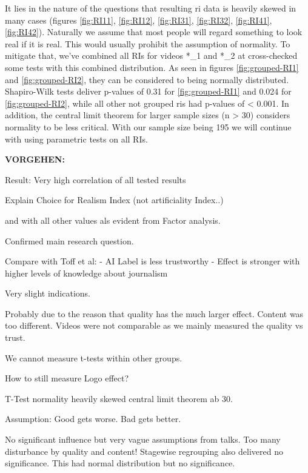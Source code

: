 \documentclass[
  a4paper,  %
  twoside,  %
  bibliography=totoc,
  headsepline,
  cleardoublepage=empty,
  parskip=half,
  draft=false
]{scrbook}
\begin{document}
It lies in the nature of the questions that resulting \gls{ri} data is heavily skewed in many cases (figures \ref{fig:RI11}, \ref{fig:RI12}, \ref{fig:RI31}, \ref{fig:RI32}, \ref{fig:RI41}, \ref{fig:RI42}). Naturally we assume that most people will regard something to look real if it is real. This would usually prohibit the assumption of normality. To mitigate that, we've combined all RIs for videos *\_1 and *\_2 at cross-checked some tests with this combined distribution. As seen in figures \ref{fig:grouped-RI1} and \ref{fig:grouped-RI2}, they can be considered to being normally distributed. Shapiro-Wilk tests deliver p-values of 0.31 for \ref{fig:grouped-RI1} and 0.024 for \ref{fig:grouped-RI2}, while all other not grouped \gls{ri}s had p-values of < 0.001. In addition, the central limit theorem for larger sample sizes (n > 30) considers normality to be less critical. With our sample size being 195 we will continue with using parametric tests on all RIs.



\textbf{VORGEHEN:}

Result: Very high correlation of all tested results

Explain Choice for Realism Index (not artificiality Index..)

and with all other values als evident from Factor analysis.

Confirmed main research question.


Compare with Toff et al: 
- AI Label is less trustworthy
- Effect is stronger with higher levels of knowledge about journalism

Very slight indications. 

Probably due to the reason that quality has the much larger effect.
Content was too different. Videos were not comparable as we mainly measured the quality vs trust. 

We cannot measure t-tests within other groups. 

How to still measure Logo effect? 


T-Test normality heavily skewed
central limit theorem ab 30.

Assumption: Good gets worse. Bad gets better. 

No significant influence but very vague assumptions from talks. 
Too many disturbance by quality and content!
Stagewise regrouping also delivered no significance.
This had normal distribution but no significance. 
\end{document}
